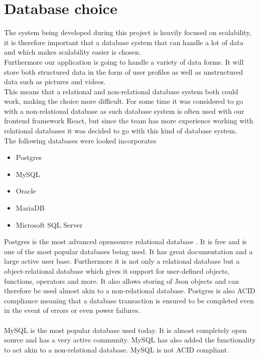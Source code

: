 \section{Database choice}
The system being developed during this project is heavily focused on scalability, it is therefore important that a database system that can handle a lot of data and which makes scalability easier is chosen.
\\
Furthermore our application is going to handle a variety of data forms. It will store both structured data in the form of user profiles as well as unstructured data such as pictures and videos.
\\
This means that a relational and non-relational database system both could work, making the choice more difficult.
For some time it was considered to go with a non-relational database as such database system is often used with our frontend framework React, but since the team has more experience working with relational databases it was decided to go with this kind of database system.
\\
The following databases were looked incorporates
\begin{itemize}
    \item Postgres
    \item MySQL
    \item Oracle
    \item MariaDB
    \item Microsoft SQL Server
\end{itemize}
Postgres is the most advanced opensource relational database \cite{Postgres}.
It is free and is one of the most popular databases being used\cite{databasePopularity}.
It has great documentation and a large active user base.
Furthermore it is not only a relational database but a object-relational database which gives it support for user-defined objects, functions, operators and more.
It also allows storing of Json objects and can therefore be used almost akin to a non-relational database.
Postgres is also ACID compliance meaning that a database transaction is ensured to be completed even in the event of errors or even power failures.
\\
\\
MySQL is the most popular database used today\cite{databasePopularity}.
It is almost completely open source and has a very active community\cite{MySQL}.
MySQL has also added the functionality to act akin to a non-relational database.
MySQL is not ACID compliant.
\\
\\

